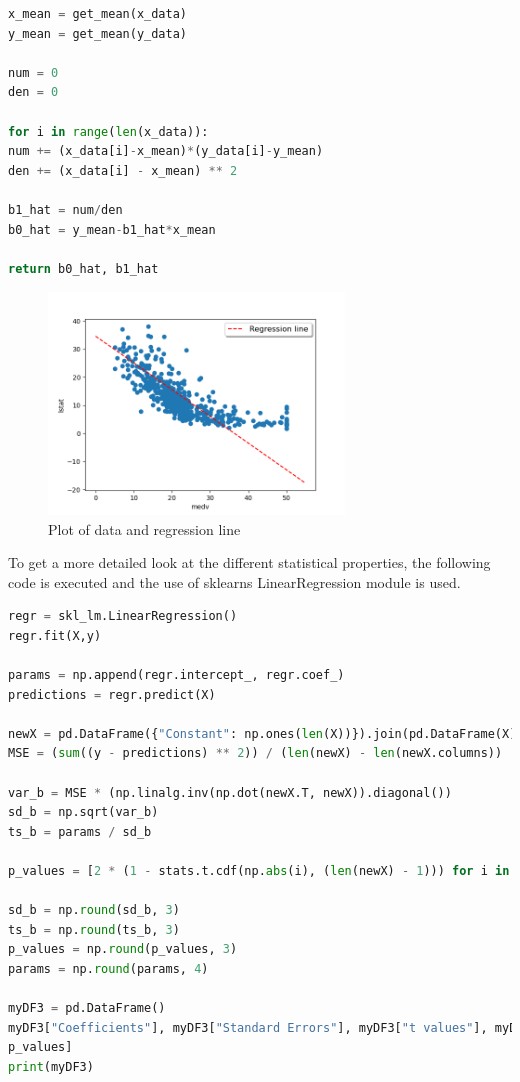 \begin{lstlisting}[language=Python]
x_mean = get_mean(x_data)
y_mean = get_mean(y_data)

num = 0
den = 0

for i in range(len(x_data)):
num += (x_data[i]-x_mean)*(y_data[i]-y_mean)
den += (x_data[i] - x_mean) ** 2

b1_hat = num/den
b0_hat = y_mean-b1_hat*x_mean

return b0_hat, b1_hat
\end{lstlisting}

\begin{figure}[H]
	\centering
	\includegraphics[width=0.7\textwidth]{Img/lab1_plot.PNG}
	\caption{Plot of data and regression line}
	\label{fig:lab1_plot}
\end{figure} 

To get a more detailed look at the different statistical properties, the following code is executed and the use of sklearns LinearRegression module is used.
\begin{lstlisting}[language=Python]
regr = skl_lm.LinearRegression()
regr.fit(X,y)

params = np.append(regr.intercept_, regr.coef_)
predictions = regr.predict(X)

newX = pd.DataFrame({"Constant": np.ones(len(X))}).join(pd.DataFrame(X))
MSE = (sum((y - predictions) ** 2)) / (len(newX) - len(newX.columns))

var_b = MSE * (np.linalg.inv(np.dot(newX.T, newX)).diagonal())
sd_b = np.sqrt(var_b)
ts_b = params / sd_b

p_values = [2 * (1 - stats.t.cdf(np.abs(i), (len(newX) - 1))) for i in ts_b]

sd_b = np.round(sd_b, 3)
ts_b = np.round(ts_b, 3)
p_values = np.round(p_values, 3)
params = np.round(params, 4)

myDF3 = pd.DataFrame()
myDF3["Coefficients"], myDF3["Standard Errors"], myDF3["t values"], myDF3["Probabilities"] = [params, sd_b, ts_b,
p_values]
print(myDF3)
\end{lstlisting}

